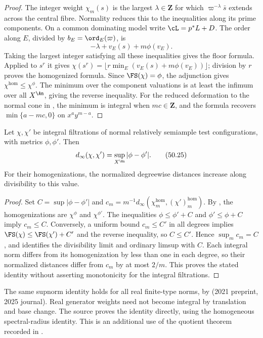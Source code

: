 \begin{proof}
The integer weight $\chi_m(s)$ is the largest $\lambda\in\mathbf Z$
for which $\varpi^{-\lambda}\bar s$ extends across the central fibre.
Normality reduces this to the inequalities along its prime components.
On a common dominating model write $\cL=p^*L+D$.  The order along
$E$, divided by $b_E=\ord_E(\varpi)$, is
\[
 -\lambda+v_E(s)+m\phi(v_E).
\]
Taking the largest integer satisfying all these inequalities gives the
floor formula.  Applied to $s^r$ it gives
$\chi(s^r)=\lfloor r\min_E(v_E(s)+m\phi(v_E))\rfloor$;
division by $r$ proves the homogenized formula.  Since
$\FS(\chi)=\phi$, the adjunction gives $\chi^{\hom}\le\chi^\phi$.
The minimum over the component valuations is at least the infimum over
all $X^{\An}$, giving the reverse inequality.
For the reduced deformation to the normal cone in
, the minimum is integral when $mc\in\mathbf Z$,
and the formula recovers $\min\{a-mc,0\}$ on $x^ay^{m-a}$.
\end{proof}

\begin{proposition}
\label{prop:ch50-dinfty-fs}
Let $\chi,\chi'$ be integral filtrations of normal relatively semiample
test configurations, with metrics $\phi,\phi'$.  Then
\[
 d_\infty(\chi,\chi')=\sup_{X^{\An}}|\phi-\phi'|.
\tag{50.25}\label{eq:ch50-dinfty-fs}
\]
For their homogenizations, the normalized degreewise distances increase
along divisibility to this value.
\end{proposition}

\begin{proof}
Set $C=\sup|\phi-\phi'|$ and
$c_m=m^{-1}d_\infty(\chi^{\hom}_m,(\chi')^{\hom}_m)$.
By , the homogenizations are $\chi^\phi$
and $\chi^{\phi'}$.  The inequalities
$\phi\le\phi'+C$ and $\phi'\le\phi+C$ imply $c_m\le C$.
Conversely, a uniform bound $c_m\le C'$ in all degrees implies
$\FS(\chi)\le\FS(\chi')+C'$ and the reverse inequality, so
$C\le C'$.  Hence $\sup_m c_m=C$, and
 identifies the divisibility limit and ordinary
limsup with $C$.  Each integral norm differs from its homogenization
by less than one in each degree, so their normalized distances differ
from $c_m$ by at most $2/m$.  This proves the stated identity without
asserting monotonicity for the integral filtrations.
\end{proof}

\begin{remark}
\label{rem:ch50-dinfty-finite-type}
The same supnorm identity holds for all real finite-type norms, by
\cite[Corollary~2.18]{BJKS1} (2021 preprint, 2025 journal).
Real generator weights need not become integral by translation and base
change.  The source proves the identity directly, using the homogeneous
spectral-radius identity.  This is an additional use of the quotient
theorem recorded in .
\end{remark}

